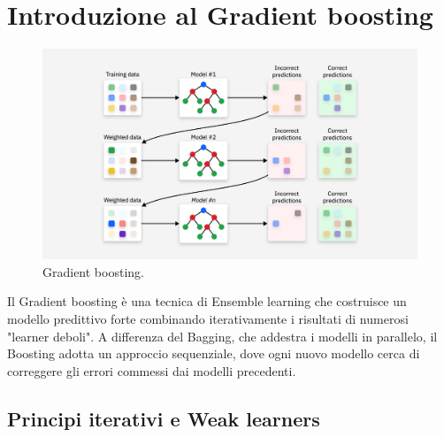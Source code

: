 \documentclass[a4paper,12pt]{report}
\begin{document}
	\section{Introduzione al Gradient boosting}
	\begin{figure}[H]
		\centering
		\includegraphics[width=1.0\textwidth]{img/grad_boost.png}
		\caption{Gradient boosting.}
	\end{figure}
	
	Il Gradient boosting è una tecnica di Ensemble learning che costruisce un modello predittivo forte combinando iterativamente i risultati di numerosi "learner deboli". A differenza del Bagging, che addestra i modelli in parallelo, il Boosting adotta un approccio sequenziale, dove ogni nuovo modello cerca di correggere gli errori commessi dai modelli precedenti.
	
	\subsection{Principi iterativi e Weak learners}
	
\end{document}
